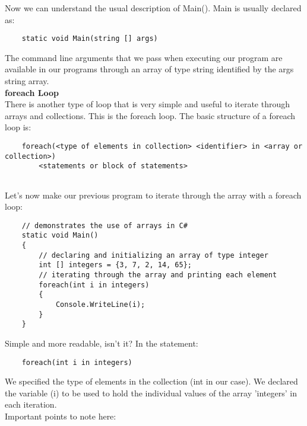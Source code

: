 Now we can understand the usual description of Main(). Main is usually declared as:

\begin{lstlisting}
    static void Main(string [] args)    
\end{lstlisting}

The command line arguments that we pass when executing our program are available in our programs through an
array of type string identified by the args string array.\\

\textbf{foreach Loop}\\

There is another type of loop that is very simple and useful to iterate through arrays and collections. This is the
foreach loop. The basic structure of a foreach loop is:

\begin{lstlisting}
    foreach(<type of elements in collection> <identifier> in <array or collection>)
        <statements or block of statements>
        
\end{lstlisting}

Let’s now make our previous program to iterate through the array with a foreach loop:

\begin{lstlisting}
    // demonstrates the use of arrays in C#
    static void Main()
    {
        // declaring and initializing an array of type integer
        int [] integers = {3, 7, 2, 14, 65};
        // iterating through the array and printing each element
        foreach(int i in integers)
        {
            Console.WriteLine(i);
        }
    }
\end{lstlisting}

Simple and more readable, isn’t it? In the statement:

\begin{lstlisting}
    foreach(int i in integers)    
\end{lstlisting}

We specified the type of elements in the collection (int in our case). We declared the variable (i) to be used to hold
the individual values of the array ’integers’ in each iteration.\\

Important points to note here:

